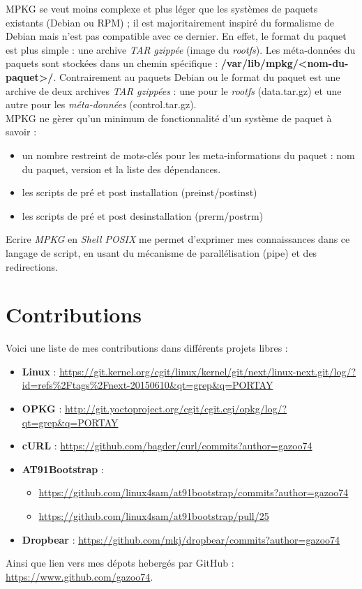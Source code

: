 \documentclass[a4paper]{article}
\begin{document}
MPKG se veut moins complexe et plus léger que les systèmes de paquets existants (Debian ou RPM) ; il est majoritairement inspiré du formalisme de Debian mais n'est pas compatible avec ce dernier. En effet, le format du paquet est plus simple : une archive \textit{TAR} \textit{gzippée} (image du \textit{rootfs}). Les méta-données du paquets sont stockées dans un chemin spécifique : \textbf{/var/lib/mpkg/<nom-du-paquet>/}.
Contrairement au paquets Debian ou le format du paquet est une archive de deux archives \textit{TAR} \textit{gzippées} : une pour le \textit{rootfs} (data.tar.gz) et une autre pour les \textit{méta-données} (control.tar.gz).\\

MPKG ne gèrer qu'un minimum de fonctionnalité d'un système de paquet à savoir :
\begin{itemize}
\item un nombre restreint de mots-clés pour les meta-informations du paquet : nom du paquet, version et la liste des dépendances.
\item les scripts de pré et post installation (preinst/postinst)
\item les scripts de pré et post desinstallation (prerm/postrm)
\end{itemize}

Ecrire \textit{MPKG} en \textit{Shell POSIX} me permet d'exprimer mes connaissances dans ce langage de script, en usant du mécanisme de parallélisation (pipe) et des redirections.
\clearpage

\appendix
\section{Contributions}
Voici une liste de mes contributions dans différents projets libres :
\begin{itemize}
\item \textbf{Linux} : \url{https://git.kernel.org/cgit/linux/kernel/git/next/linux-next.git/log/?id=refs\%2Ftags\%2Fnext-20150610&qt=grep&q=PORTAY}
\item \textbf{OPKG} : \url{http://git.yoctoproject.org/cgit/cgit.cgi/opkg/log/?qt=grep&q=PORTAY}
\item \textbf{cURL} : \url{https://github.com/bagder/curl/commits?author=gazoo74}
\item \textbf{AT91Bootstrap} :
\begin{itemize}
\item \url{https://github.com/linux4sam/at91bootstrap/commits?author=gazoo74}
\item \url{https://github.com/linux4sam/at91bootstrap/pull/25}
\end{itemize}
\item \textbf{Dropbear} : \url{https://github.com/mkj/dropbear/commits?author=gazoo74}
\end{itemize}
Ainsi que lien vers mes dépots hebergés par GitHub : \url{https://www.github.com/gazoo74}.
\end{document}
